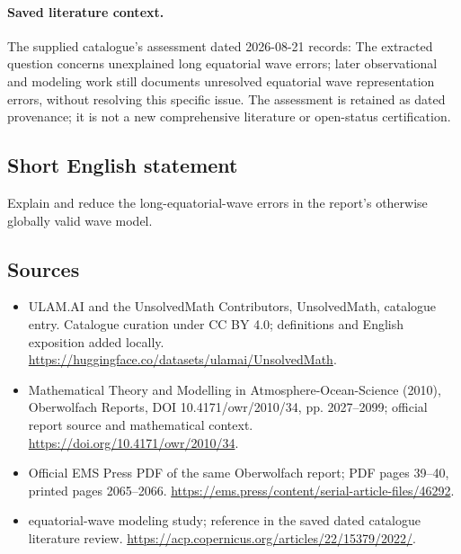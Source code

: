 \documentclass[11pt]{article}
\begin{document}
\paragraph{Saved literature context.} The supplied catalogue's assessment dated 2026-08-21 records: The extracted question concerns unexplained long equatorial wave errors; later observational and modeling work still documents unresolved equatorial wave representation errors, without resolving this specific issue. The assessment is retained as dated provenance; it is not a new comprehensive literature or open-status certification.
\subsection{Short English statement}
Explain and reduce the long-equatorial-wave errors in the report's otherwise globally valid wave model.
\subsection{Sources}
\begin{itemize}
\item[\hypertarget{source:statement:1}{S1}] ULAM.AI and the UnsolvedMath Contributors, UnsolvedMath, catalogue entry. Catalogue curation under CC BY 4.0; definitions and English exposition added locally.
\url{https://huggingface.co/datasets/ulamai/UnsolvedMath}.
\item[\hypertarget{source:statement:2}{S2}] Mathematical Theory and Modelling in Atmosphere-Ocean-Science (2010), Oberwolfach Reports, DOI 10.4171/owr/2010/34, pp. 2027--2099; official report source and mathematical context.
\url{https://doi.org/10.4171/owr/2010/34}.
\item[\hypertarget{source:statement:3}{S3}] Official EMS Press PDF of the same Oberwolfach report; PDF pages 39--40, printed pages 2065--2066.
\url{https://ems.press/content/serial-article-files/46292}.
\item[\hypertarget{source:statement:4}{S4}] equatorial-wave modeling study; reference in the saved dated catalogue literature review.
\url{https://acp.copernicus.org/articles/22/15379/2022/}.
\end{itemize}
\label{end:statement}
\end{document}
